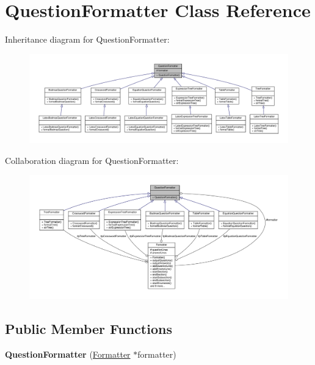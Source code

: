 \hypertarget{classQuestionFormatter}{}\section{Question\+Formatter Class Reference}
\label{classQuestionFormatter}


Inheritance diagram for Question\+Formatter\+:
\nopagebreak
\begin{figure}[H]
\begin{center}
\leavevmode
\includegraphics[width=350pt]{classQuestionFormatter__inherit__graph}
\end{center}
\end{figure}


Collaboration diagram for Question\+Formatter\+:
\nopagebreak
\begin{figure}[H]
\begin{center}
\leavevmode
\includegraphics[width=350pt]{classQuestionFormatter__coll__graph}
\end{center}
\end{figure}
\subsection*{Public Member Functions}
\begin{DoxyCompactItemize}
\item 
{\bfseries Question\+Formatter} (\hyperlink{classFormatter}{Formatter} $\ast$formatter)\hypertarget{classQuestionFormatter_acfe7d87dff4ef32b73d2b6145a174dd9}{}\label{classQuestionFormatter_acfe7d87dff4ef32b73d2b6145a174dd9}

\end{DoxyCompactItemize}

